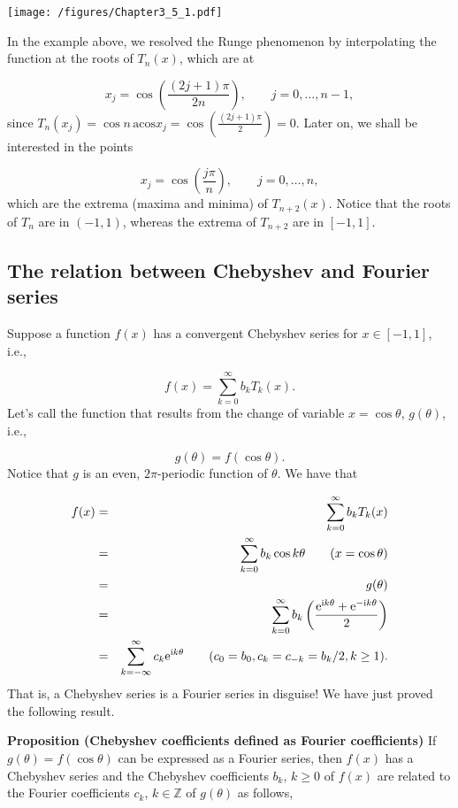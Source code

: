 \documentclass[12pt,a4paper]{article}
\begin{document}
\texttt{[image: /figures/Chapter3\_5\_1.pdf]}

In the example above, we resolved the Runge phenomenon by interpolating the function at the roots of $T_n(x)$, which are at

\[
    x_j = \cos\left(\frac{(2j+1)\pi}{2n}\right), \qquad j = 0, \ldots, n-1, 
\]
since $T_n(x_j) = \cos n\,\mathrm{acos} x_j = \cos\left(\frac{(2j+1)\pi}{2}\right) = 0$.  Later on, we shall be interested in the points

\[
x_j = \cos\left(\frac{j\pi}{n}\right), \qquad j = 0, \ldots, n, 
\]
which are the extrema (maxima and minima) of $T_{n+2}(x)$.  Notice that the roots of $T_n$ are in $(-1, 1)$, whereas the extrema of $T_{n+2}$ are in $[-1, 1]$.

\subsection{The relation between Chebyshev and Fourier series}
Suppose a function $f(x)$ has a convergent Chebyshev series for $x \in [-1, 1]$, i.e.,

\[
f(x) = \sum_{k=0}^{\infty} b_k T_k(x).
\]
Let's call the function that results from the change of variable $x = \cos \theta$, $g(\theta)$, i.e.,

\[
g(\theta) = f(\cos \theta).
\]
Notice that $g$ is an even, $2\pi$-periodic function of $\theta$.  We have that


\begin{eqnarray*}
f(x) &=& \sum_{k=0}^{\infty} b_k T_k(x) \\
  &=& \sum_{k=0}^{\infty} b_k\cos k\theta   \qquad (x = \cos \theta)  \\
  & = & g(\theta) \\
  &=& \sum_{k=0}^{\infty} b_k\left(\frac{{\rm e}^{{\rm i}k\theta} + {\rm e}^{-{\rm i}k\theta}}{2}   \right) \\
  &=& \sum_{k=-\infty}^{\infty} c_k {\rm e}^{{\rm i}k\theta}  \qquad (c_0 = b_0, c_{k} = c_{-k} = b_k/2, k\geq 1).
\end{eqnarray*}
That is, a Chebyshev series is a Fourier series in disguise! We have just proved the following result.

\textbf{Proposition (Chebyshev coefficients defined as Fourier coefficients)} If $g(\theta) = f(\cos \theta)$ can be expressed as a Fourier series, then $f(x)$ has a Chebyshev series and the Chebyshev coefficients $b_k$, $k \geq 0$ of $f(x)$ are related to the Fourier coefficients $c_k$, $k \in \mathbb{Z}$  of $g(\theta)$ as follows,
\end{document}
